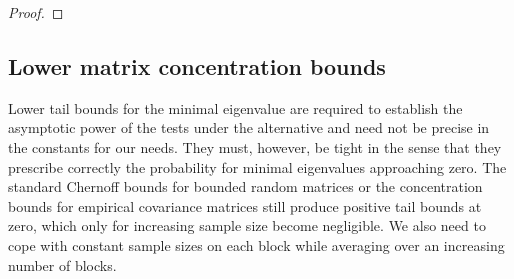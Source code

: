 \documentclass[preprint,aos]{imsart}
\numberwithin{equation}{section}
\theoremstyle{remark}
\DeclareMathOperator{\E}{{\mathbb E}}
\DeclareMathOperator{\PP}{{\mathbb P}}
\DeclareMathOperator{\trace}{trace}
\renewcommand{\theta}{\vartheta}
\providecommand{\norm}[1]{\lVert #1 \rVert}
\providecommand{\bnorm}[1]{{\Bigl\lVert #1 \Bigr\rVert}}
\renewcommand{\le}{\leqslant}
\renewcommand{\ge}{\geqslant}
\begin{document}
\begin{appendix}
\begin{proof}
\begin{comment}
&\qquad\le \inf_{\theta>0} \exp\Big(-\theta t+\sum_{k=1}^K\log\Big(\E\Big[\exp\Big(\theta\lambda_{max}\Big(\sum_{j\ge 1} (Y_{jk}Y_{jk}^\top-A_{jk})\Big)\Big)\Big]\Big)\Big)\\
&\qquad\le \inf_{\theta>0} \exp\Big(-\theta t+\sum_{k=1}^K\log\Big(\E\Big[\trace\Big(\exp\Big(\theta\sum_{j\ge 1} (Y_{jk}Y_{jk}^\top-A_{jk})\Big)\Big)\Big]-(d-1)\Big)\Big)\\
&\qquad\le \inf_{\theta>0} \exp\Big(-\theta t+\sum_{k=1}^K\log\Big(1+d\Big(\exp\Big(\bnorm{\sum_{j\ge 1} \log\big(\E\big[e^{\theta (Y_{jk}Y_{jk}^\top-A_{jk})}\big]\big)}\Big)-1\Big)\Big)\\
&\qquad\le \inf_{\theta>0} \exp\Big(-\theta t+\sum_{k=1}^Kd\bnorm{\sum_{j\ge 1} \log\big(\E\big[e^{\theta (Y_{jk}Y_{jk}^\top-A_{jk})}\big]\big)}\Big)\Big).
\end{align*}
In the proof of Theorem \ref{ThmBernstein} we have already shown
\begin{align*}
& \bnorm{\sum_{j\ge 1} \log\big(\E\big[e^{\theta (Y_{jk}Y_{jk}^\top-A_{jk})}\big]\big)}\\
&\le \frac{\theta}{2}\Big(\theta^{-1}-\sup_{j\ge 1}(\trace(A_{jk})+4\norm{A_{jk}})\Big)^{-1} \bnorm{\sum_{j\ge 1}\big(\trace(A_{jk}) A_{jk}+2A_{jk}^2\big)}\\
&\le \frac\theta{2(\theta^{-1}-R)}\bnorm{\sum_{j\ge 1}\big(\trace(A_{jk}) A_{jk}+2A_{jk}^2\big)}
\end{align*}
for $\theta^{-1}>R$. This yields
\begin{align*}
&\PP\Big(\sum_{k=1}^K\lambda_{max}\Big(\sum_{j\ge 1} (Y_{jk}Y_{jk}^\top-A_{jk})\Big)\ge t\Big) \le \inf_{\theta\in(0,R^{-1})} \exp\Big(-\theta t+\frac{\theta d \sigma^2}{2(\theta^{-1}-R)}\Big).
\end{align*}
The choice
$\theta=\frac{t}{d\sigma^2+tR}$
results in the asserted upper deviation probability bound. The high probability bound follows in complete analogy to the corresponding part in Theorem \ref{ThmBernstein}.
\end{comment}
\end{proof}



\subsection{Lower matrix concentration bounds}

Lower tail bounds for the minimal eigenvalue are required to establish the asymptotic power of the tests under the alternative and need not be precise in the constants for our needs. They must, however, be tight in the sense that they prescribe correctly the probability for minimal eigenvalues approaching zero. The standard Chernoff bounds for bounded random matrices \citep{tropp2012} or the concentration bounds for empirical covariance matrices \citep{koltchinskii2015} still produce positive tail bounds at zero, which only for increasing sample size become negligible. We also need to cope with constant sample sizes on each block while averaging over an increasing number of blocks.


\end{appendix}
\end{document}
